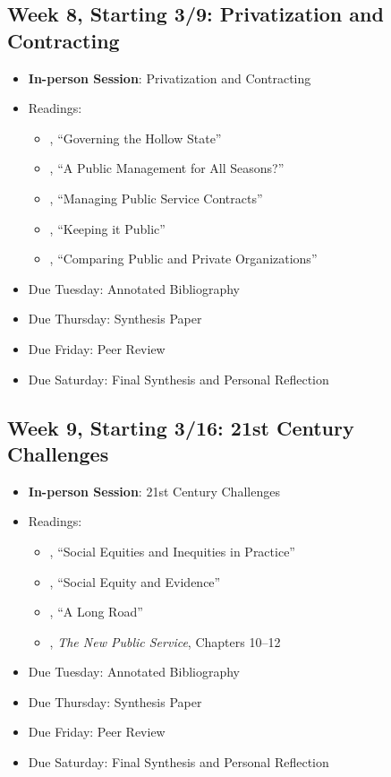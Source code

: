 \documentclass[12pt, letterpaper]{article}
\begin{document}
\subsection*{Week 8, Starting 3/9: Privatization and Contracting}
\begin{itemize}
    \item \textbf{In-person Session}: Privatization and Contracting
    \item Readings:
        \begin{itemize}
            \item \citet{MILWARD2000a}, ``Governing the Hollow State''
            \item \cite{hood1991}, ``A Public Management for All Seasons?''
            \item \citet{brownManagingPublicService2006}, ``Managing Public Service Contracts''
            \item \citet{jos2009}, ``Keeping it Public''
            \item \citet{raineyComparingPublicPrivate2000}, ``Comparing Public and Private Organizations''
        \end{itemize}
    \item Due Tuesday: Annotated Bibliography
    \item Due Thursday: Synthesis Paper
    \item Due Friday: Peer Review
    \item Due Saturday: Final Synthesis and Personal Reflection
\end{itemize}

\subsection*{Week 9, Starting 3/16: 21st Century Challenges}
\begin{itemize}
    \item \textbf{In-person Session}: 21st Century Challenges
    \item Readings:
        \begin{itemize}
            \item \citet{maynard-moody2012}, ``Social Equities and Inequities in Practice'' 
            \item \citet{GOODEN2017}, ``Social Equity and Evidence'' 
            \item \citet{mccandless2022}, ``A Long Road''
            \item \citet{Denhardt2015}, \emph{The New Public Service}, Chapters 10--12 
        \end{itemize}
    \item Due Tuesday: Annotated Bibliography
    \item Due Thursday: Synthesis Paper
    \item Due Friday: Peer Review
    \item Due Saturday: Final Synthesis and Personal Reflection
\end{itemize}
\end{document}

